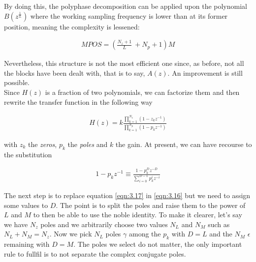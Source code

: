 By doing this, the polyphase decomposition can be applied upon the polynomial $B(z^{\frac{1}{L}})$ where the working sampling frequency is lower than at its former position, meaning the complexity is lessened:

%

\begin{align}
	MPOS = (\frac{N_z+1}{L}\ + N_p + 1)M\label{eqn:3.15}
\end{align}

Nevertheless, this structure is not the most efficient one since, as before, not all the blocks have been dealt with, that is to say, $A(z)$. An improvement is still possible.\\

Since $H(z)$ is a fraction of two polynomials, we can factorize them and then rewrite the transfer function in the following way

\begin{align}
	H(z) = k\frac{\prod\limits_{k=1}^{N_z} (1 - z_k z^{-1} )}{\prod\limits_{k=1}^{N_p} (1 - p_k z^{-1})}
	\label{eqn:3.16}
\end{align}

with $z_k$ the \textit{zeros}, $p_k$ the \textit{poles} and $k$ the gain. At present, we can have recourse to the substitution 

\begin{align}
	1 - p_kz^{-1} \equiv \frac{1 - p_k^Dz^{-D}}{\sum\limits_{i=0}^{D-1}p_k^iz^{-i}}
	\label{eqn:3.17}
\end{align} 


The next step is to replace equation \ref{eqn:3.17} in \ref{eqn:3.16} but we need to assign some values to $D$. The point is to split the poles and raise them to the power of $L$ and $M$ to then be able to use the noble identity. To make it clearer, let's say we have $N_z$ poles and we arbitrarily choose two values $N_L$ and $N_M$ such as $N_L + N_M = N_z$. Now we pick $N_L$ poles $\gamma$ among the $p_k$ with $D = L$ and the $N_M$ $\epsilon$ remaining with $D = M$. The poles we select do not matter, the only important rule to fullfil is to not separate the complex conjugate poles. 

